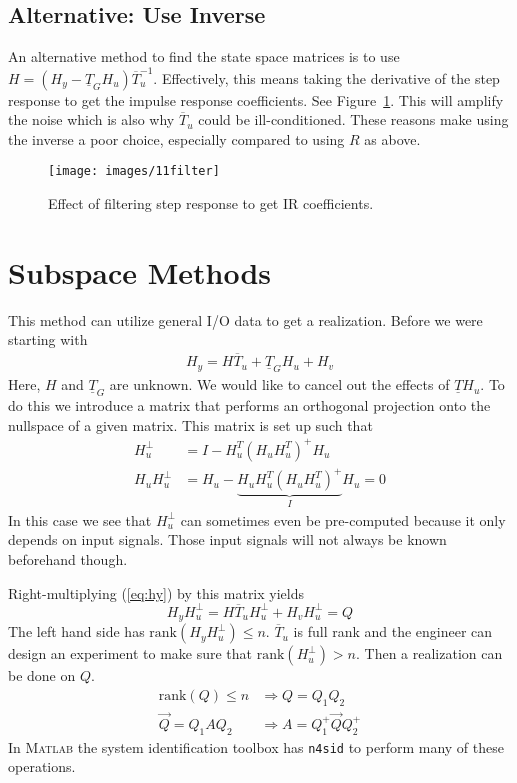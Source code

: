 \subsection{Alternative: Use Inverse}
An alternative method to find the state space matrices is to use $H=(H_y-\underline{T}_G H_u)\overline{T}_u^{-1}$.
Effectively, this means taking the derivative of the step response to get the impulse response coefficients.
See Figure~\ref{fig:11filter}.
This will amplify the noise which is also why $\overline{T}_u$ could be ill-conditioned.
These reasons make using the inverse a poor choice, especially compared to using $R$ as above.

\begin{figure}[ht!]
\centering
\texttt{[image: images/11filter]}
\caption{Effect of filtering step response to get IR coefficients.}
\label{fig:11filter}
\end{figure}

\section{Subspace Methods}
This method can utilize general I/O data to get a realization.
Before we were starting with
\begin{align}
\label{eq:hy}
H_y=H\overline{T}_u+\underline{T}_G H_u+H_v
\end{align}
Here, $H$ and $\underline{T}_G$ are unknown.
We would like to cancel out the effects of $\underline{T}H_u$.
To do this we introduce a matrix that performs an orthogonal projection onto the nullspace of a given matrix.
This matrix is set up such that
\begin{align*}
H_u^\perp &= I-H_u^T{(H_u H_u^T)}^+H_u \\
H_u H_u^\perp &= H_u - \underbrace{H_u H_u^T{(H_u H_u^T)}^+}_{I}H_u = 0
\end{align*}
In this case we see that $H_u^\perp$ can sometimes even be pre-computed because it only depends on input signals.
Those input signals will not always be known beforehand though.

Right-multiplying (\ref{eq:hy}) by this matrix yields
$$H_y H_u^\perp = H\overline{T}_u H_u^\perp + H_v H_u^\perp = Q$$
The left hand side has $\text{rank}(H_y H_u^\perp)\leq n$.
$\overline{T}_u$ is full rank and the engineer can design an experiment to make sure that $\text{rank}(H_u^\perp)>n$.
Then a realization can be done on $Q$.
\begin{align*}
\text{rank}(Q) \leq n &\Rightarrow Q=Q_1Q_2 \\
\vec{Q} = Q_1AQ_2 &\Rightarrow A=Q_1^+\vec{Q}Q_2^+
\end{align*}
In \textsc{Matlab} the system identification toolbox has \texttt{n4sid} to perform many of these operations.

